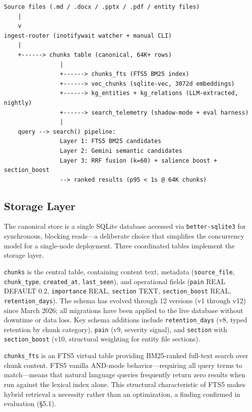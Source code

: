\documentclass{article}
\begin{document}
\begin{verbatim}
Source files (.md / .docx / .pptx / .pdf / entity files)
    |
    v
ingest-router (inotifywait watcher + manual CLI)
    |
    +------> chunks table (canonical, 64K+ rows)
                |
                +------> chunks_fts (FTS5 BM25 index)
                +------> vec_chunks (sqlite-vec, 3072d embeddings)
                +------> kg_entities + kg_relations (LLM-extracted, nightly)
                +------> search_telemetry (shadow-mode + eval harness)
                |
    query --> search() pipeline:
                Layer 1: FTS5 BM25 candidates
                Layer 2: Gemini semantic candidates
                Layer 3: RRF fusion (k=60) + salience boost + section_boost
                --> ranked results (p95 < 1s @ 64K chunks)
\end{verbatim}

\subsection{Storage Layer}

The canonical store is a single SQLite database accessed via \texttt{better-sqlite3} for
synchronous, blocking reads---a deliberate choice that simplifies the concurrency model for
a single-node deployment. Three coordinated tables implement the storage layer.

\texttt{chunks} is the central table, containing content text, metadata
(\texttt{source\_file}, \texttt{chunk\_type}, \texttt{created\_at}, \texttt{last\_seen}),
and operational fields (\texttt{pain} REAL DEFAULT 0.2, \texttt{importance} REAL,
\texttt{section} TEXT, \texttt{section\_boost} REAL, \texttt{retention\_days}). The schema
has evolved through 12 versions (v1 through v12) since March 2026; all migrations have been
applied to the live database without downtime or data loss. Key schema additions include
\texttt{retention\_days} (v8, typed retention by chunk category), \texttt{pain} (v9,
severity signal), and \texttt{section} with \texttt{section\_boost} (v10, structural
weighting for entity file sections).

\texttt{chunks\_fts} is an FTS5 virtual table providing BM25-ranked full-text search over
chunk content. FTS5 vanilla AND-mode behavior---requiring all query terms to
match---means that natural language queries frequently return zero results when run against
the lexical index alone. This structural characteristic of FTS5 makes hybrid retrieval a
necessity rather than an optimization, a finding confirmed in evaluation (\S5.1).
\end{document}
